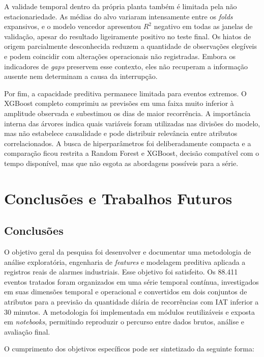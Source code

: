 A validade temporal dentro da própria planta também é limitada pela não estacionariedade. As médias do alvo variaram intensamente entre os \textit{folds} expansivos, e o modelo vencedor apresentou $R^2$ negativo em todas as janelas de validação, apesar do resultado ligeiramente positivo no teste final. Os hiatos de origem parcialmente desconhecida reduzem a quantidade de observações elegíveis e podem coincidir com alterações operacionais não registradas. Embora os indicadores de \textit{gaps} preservem esse contexto, eles não recuperam a informação ausente nem determinam a causa da interrupção.

Por fim, a capacidade preditiva permanece limitada para eventos extremos. O XGBoost completo comprimiu as previsões em uma faixa muito inferior à amplitude observada e subestimou os dias de maior recorrência. A importância interna das árvores indica quais variáveis foram utilizadas nas divisões do modelo, mas não estabelece causalidade e pode distribuir relevância entre atributos correlacionados. A busca de hiperparâmetros foi deliberadamente compacta e a comparação ficou restrita a Random Forest e XGBoost, decisão compatível com o tempo disponível, mas que não esgota as abordagens possíveis para a série.

\section{Conclusões e Trabalhos Futuros}
\label{sec:conclusao}

\subsection{Conclusões}

O objetivo geral da pesquisa foi desenvolver e documentar uma metodologia de análise exploratória, engenharia de \textit{features} e modelagem preditiva aplicada a registros reais de alarmes industriais. Esse objetivo foi satisfeito. Os 88.411 eventos tratados foram organizados em uma série temporal contínua, investigados em suas dimensões temporal e operacional e convertidos em dois conjuntos de atributos para a previsão da quantidade diária de recorrências com IAT inferior a 30 minutos. A metodologia foi implementada em módulos reutilizáveis e exposta em \textit{notebooks}, permitindo reproduzir o percurso entre dados brutos, análise e avaliação final.

O cumprimento dos objetivos específicos pode ser sintetizado da seguinte forma:

